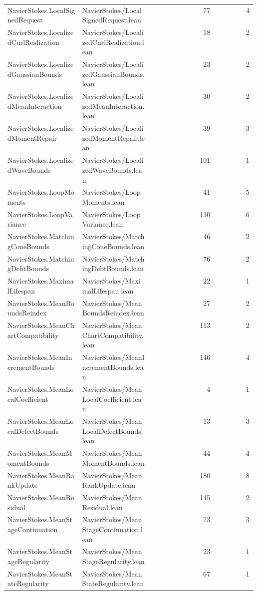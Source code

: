 \begin{longtable}{p{0.30\linewidth}p{0.28\linewidth}rr}
NavierStokes.LocalSignedRequest & NavierStokes/LocalSignedRequest.lean & 77 & 4\\
NavierStokes.LocalizedCurlRealization & NavierStokes/LocalizedCurlRealization.lean & 18 & 2\\
NavierStokes.LocalizedGaussianBounds & NavierStokes/LocalizedGaussianBounds.lean & 23 & 2\\
NavierStokes.LocalizedMeanInteraction & NavierStokes/LocalizedMeanInteraction.lean & 30 & 2\\
NavierStokes.LocalizedMomentRepair & NavierStokes/LocalizedMomentRepair.lean & 39 & 3\\
NavierStokes.LocalizedWaveBounds & NavierStokes/LocalizedWaveBounds.lean & 101 & 1\\
NavierStokes.LoopMoments & NavierStokes/LoopMoments.lean & 41 & 5\\
NavierStokes.LoopVariance & NavierStokes/LoopVariance.lean & 130 & 6\\
NavierStokes.MatchingConeBounds & NavierStokes/MatchingConeBounds.lean & 46 & 2\\
NavierStokes.MatchingDebtBounds & NavierStokes/MatchingDebtBounds.lean & 76 & 2\\
NavierStokes.MaximalLifespan & NavierStokes/MaximalLifespan.lean & 22 & 1\\
NavierStokes.MeanBoundsReindex & NavierStokes/MeanBoundsReindex.lean & 27 & 2\\
NavierStokes.MeanChartCompatibility & NavierStokes/MeanChartCompatibility.lean & 113 & 2\\
NavierStokes.MeanIncrementBounds & NavierStokes/MeanIncrementBounds.lean & 146 & 4\\
NavierStokes.MeanLocalCoefficient & NavierStokes/MeanLocalCoefficient.lean & 4 & 1\\
NavierStokes.MeanLocalDefectBounds & NavierStokes/MeanLocalDefectBounds.lean & 13 & 3\\
NavierStokes.MeanMomentBounds & NavierStokes/MeanMomentBounds.lean & 44 & 4\\
NavierStokes.MeanRankUpdate & NavierStokes/MeanRankUpdate.lean & 180 & 8\\
NavierStokes.MeanResidual & NavierStokes/MeanResidual.lean & 145 & 2\\
NavierStokes.MeanStageContinuation & NavierStokes/MeanStageContinuation.lean & 73 & 3\\
NavierStokes.MeanStageRegularity & NavierStokes/MeanStageRegularity.lean & 23 & 1\\
NavierStokes.MeanStateRegularity & NavierStokes/MeanStateRegularity.lean & 67 & 1\\

\end{longtable}
